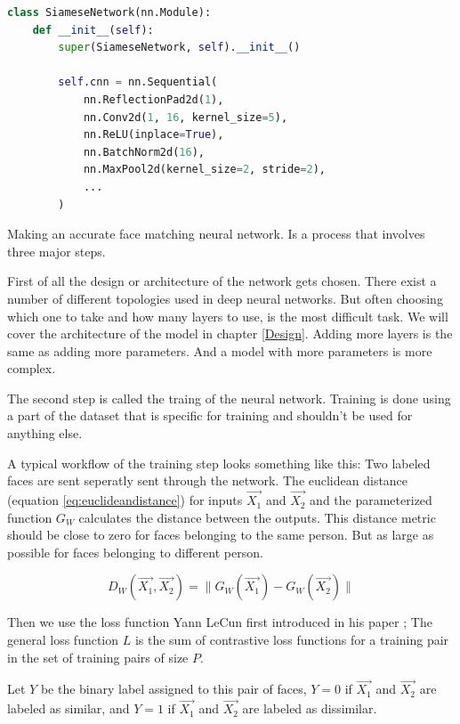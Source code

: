 \begin{lstlisting}[language=Python, caption={Pytorch neural network example}, label={lst:pytorch_example}, frame=single]
class SiameseNetwork(nn.Module):
    def __init__(self):
        super(SiameseNetwork, self).__init__()

        self.cnn = nn.Sequential(
            nn.ReflectionPad2d(1),
            nn.Conv2d(1, 16, kernel_size=5),
            nn.ReLU(inplace=True),
            nn.BatchNorm2d(16),
            nn.MaxPool2d(kernel_size=2, stride=2),
            ...
        )
\end{lstlisting}

Making an accurate face matching neural network. Is a process that involves three major steps.

First of all the design or architecture of the network gets chosen. There exist a number of different topologies used in deep neural networks. But often choosing which one to take and how many layers to use, is the most difficult task. We will cover the architecture of the model in chapter \ref{Design}. Adding more layers is the same as adding more parameters. And a model with more parameters is more complex.

The second step is called the traing of the neural network. Training is done using a part of the dataset that is specific for training and shouldn't be used for anything else.

A typical workflow of the training step looks something like this: Two labeled faces are sent seperatly sent through the network. The euclidean distance (equation \ref{eq:euclideandistance}) for inputs $\vec{X_{1}}$ and $\vec{X_{2}}$ and the parameterized function $G_{W}$ calculates the distance between the outputs. This distance metric should be close to zero for faces belonging to the same person. But as large as possible for faces belonging to different person.

\begin{equation} \label{eq:euclideandistance}
  D_{W}(\vec{X_{1}},\vec{X_{2}})=\lVert G_{W}(\vec{X_{1}}) - G_{W}(\vec{X_{2}}) \rVert
\end{equation}

Then we use the loss function Yann LeCun first introduced in his paper \cite{hadsell2006dimensionality}; The general loss function $L$ is the sum of contrastive loss functions for a training pair in the set of training pairs of size $P$.

Let $Y$ be the binary label assigned to this pair of faces, $Y=0$ if $\vec{X_{1}}$ and $\vec{X_{2}}$ are labeled as similar, and $Y=1$ if $\vec{X_{1}}$ and $\vec{X_{2}}$ are labeled as dissimilar.

